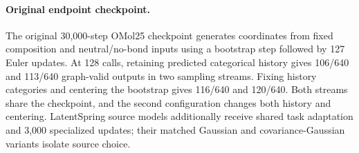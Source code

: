\paragraph{Original endpoint checkpoint.}
The original 30,000-step OMol25 checkpoint generates coordinates from fixed composition and neutral/no-bond inputs using a bootstrap step followed by 127 Euler updates. At 128 calls, retaining predicted categorical history gives 106/640 and 113/640 graph-valid outputs in two sampling streams. Fixing history categories and centering the bootstrap gives 116/640 and 120/640. Both streams share the checkpoint, and the second configuration changes both history and centering. LatentSpring source models additionally receive shared task adaptation and 3,000 specialized updates; their matched Gaussian and covariance-Gaussian variants isolate source choice.
